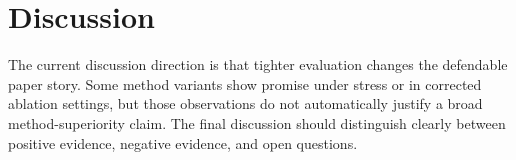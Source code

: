 \section{Discussion}

The current discussion direction is that tighter evaluation changes the defendable paper story. Some method variants show promise under stress or in corrected ablation settings, but those observations do not automatically justify a broad method-superiority claim. The final discussion should distinguish clearly between positive evidence, negative evidence, and open questions.
